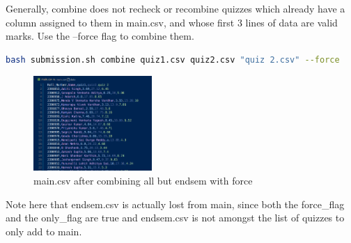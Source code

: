 \documentclass{article}
\begin{document}
    Generally, combine does not recheck or recombine quizzes which already have a column assigned to them in main.csv, and whose first 3 lines of data are valid marks. Use the --force flag to combine them.
    \begin{lstlisting}[language=bash]
        bash submission.sh combine quiz1.csv quiz2.csv "quiz 2.csv" --force
    \end{lstlisting}
    \begin{figure}[htbp]
        \centering
        \includegraphics[width=0.4\textwidth]{Force_flag}
        \caption{main.csv after combining all but endsem with force}
        \label{fig:combine_quiz1_force}
    \end{figure}
    Note here that endsem.csv is actually lost from main, since both the force\_flag and the only\_flag are true and endsem.csv is not amongst the list of quizzes to only add to main.
        
\end{document}
